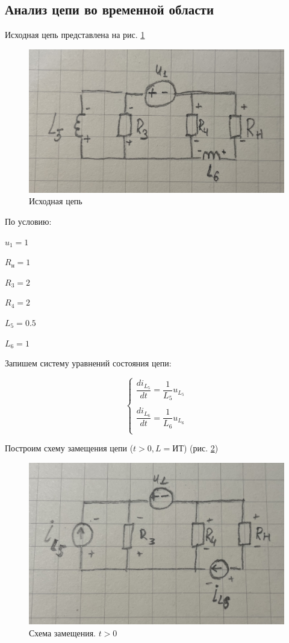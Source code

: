 \subsection{Анализ цепи во временной области}\label{sec:analysis}

Исходная цепь представлена на рис. \ref{fig:circ_source}

\begin{figure}[H]
    \centering
    \includegraphics[width=0.7\linewidth]{photo/circ_source}
    \caption{Исходная цепь}
    \label{fig:circ_source}
\end{figure}

По условию:

$ u_1 = 1 $

$ R_н = 1  $

$ R_3 = 2 $

$ R_4 = 2 $

$ L_5 = 0.5 $

$ L_6 = 1 $

Запишем систему уравнений состояния цепи:

\begin{equation}\label{eq:state}
    \begin{cases}
        \dfrac{di_{L_5}}{dt} = \dfrac{1}{L_5} u_{L_5}\\\\
        \dfrac{di_{L_6}}{dt} = \dfrac{1}{L_6} u_{L_6}\\
    \end{cases}
\end{equation}

Построим схему замещения цепи 
($ t > 0, L = ИТ $) 
(рис. \ref{fig:circ_replaced_1})

\begin{figure}[H]
    \centering
    \includegraphics[width=0.7\linewidth]{photo/circ_replaced_1}
    \caption{Схема замещения. $ t > 0 $}
    \label{fig:circ_replaced_1}
\end{figure}

